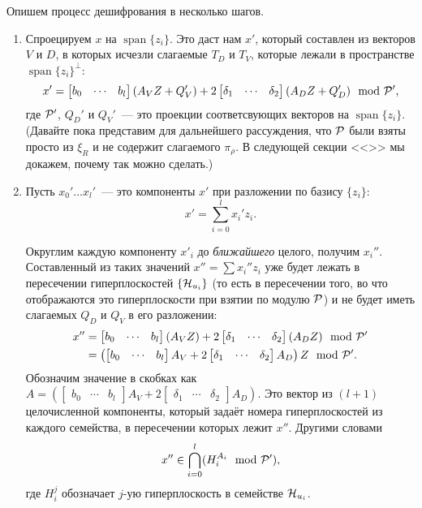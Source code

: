 \documentclass[oneside, a4paper]{article}
\theoremstyle{plain}
\theoremstyle{definition}
\theoremstyle{remark}
\DeclareMathOperator{\Span}{span}
\newcommand\PP{\ensuremath \mathcal P}
\newcommand\HH{\ensuremath \operatorname{\mathcal H}}
\begin{document}
Опишем процесс дешифрования в несколько шагов.
\begin{enumerate}

  \item Спроецируем $x$ на $\Span \{z_i\}$. Это даст нам $x'$, который составлен
  из векторов $V$ и $D$, в которых исчезли слагаемые $T_D$ и $T_V$, которые
  лежали в пространстве $\Span \{z_i\}^\bot$:
  \[
  x' = \begin{bmatrix} b_0 & \cdots & b_l \end{bmatrix} (A_V Z + Q_V')
     + 2 \begin{bmatrix} \delta_1 & \cdots & \delta_2 \end{bmatrix}
        (A_D Z + Q_D')
     \mod \PP',
  \]
  где $\PP'$, $Q_D'$ и $Q_V'$~--- это проекции соответсвующих векторов на
  $\Span\{z_i\}$. (Давайте пока представим для дальнейшего рассуждения, что
  $\PP$ были взяты просто из $\xi_R$ и не содержит слагаемого $\pi_\rho$. В
  следующей секции <<>> мы докажем, почему так можно
  сделать.)

  \item Пусть $x_0' \dots x_l'$~--- это компоненты $x'$ при разложении по базису
  $\{z_i\}$:
  \[
  x' = \sum_{i = 0}^l x_i' z_i.
  \]
  
  Округлим каждую компоненту $x'_i$ до \emph{ближайшего} целого, получим
  $x_i''$. Составленный из таких значений $x'' = \sum x_i'' z_i$ уже будет
  лежать в пересечении гиперплоскостей $\{\HH_{u_i}\}$ (то есть в пересечении
  того, во что отображаются это гиперплоскости при взятии по модулю $\PP$) и не
  будет иметь слагаемых $Q_D$ и $Q_V$ в его разложении:
  \[
  \begin{aligned}
    x'' &= \begin{bmatrix} b_0 & \cdots & b_l \end{bmatrix} (A_V Z)
        + 2 \begin{bmatrix} \delta_1 & \cdots & \delta_2 \end{bmatrix}
          (A_D Z)
        \mod \PP' \\
        &= \left (\begin{bmatrix} b_0 & \cdots & b_l \end{bmatrix} A_V
         + 2 \begin{bmatrix} \delta_1 & \cdots & \delta_2 \end{bmatrix} A_D
         \right) Z
         \mod \PP'.
  \end{aligned}
  \]
  Обозначим значение в скобках как $A = (\begin{bmatrix} b_0 & \cdots &
  b_l \end{bmatrix} A_V + 2 \begin{bmatrix} \delta_1 & \cdots & \delta_2
  \end{bmatrix} A_D)$. Это вектор из ${(l + 1)}$ целочисленной компоненты,
  который задаёт номера гиперплоскостей из каждого семейства, в пересечении
  которых лежит $x''$. Другими словами
  \[
    x'' \in \bigcap_{i = 0}^l (H_i^{A_i} \mod \PP'),
  \]
  где $H_i^j$ обозначает $j$-ую гиперплоскость в семействе $\HH_{u_i}$.


\end{enumerate}
\end{document}
